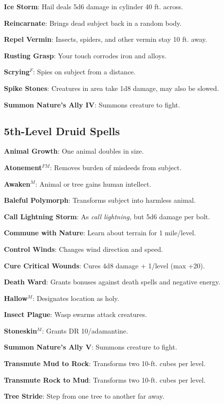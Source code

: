 \textbf{Ice Storm}: Hail deals 5d6 damage in cylinder 40 ft. across.

\textbf{Reincarnate}: Brings dead subject back in a random body.

\textbf{Repel Vermin}: Insects, spiders, and other vermin stay 10 ft. away.

\textbf{Rusting Grasp}: Your touch corrodes iron and alloys.

\textbf{Scrying}\(^{F}\): Spies on subject from a distance.

\textbf{Spike Stones}: Creatures in area take 1d8 damage, may also be slowed\textit{.}

\textbf{Summon Nature's Ally IV}: Summons creature to fight.

\subsection{5th-Level Druid Spells}


\textbf{Animal Growth}: One animal doubles in size.

\textbf{Atonement}\(^{FM}\): Removes burden of misdeeds from subject.

\textbf{Awaken}\(^{M}\): Animal or tree gains human intellect.

\textbf{Baleful Polymorph}: Transforms subject into harmless animal.

\textbf{Call Lightning Storm}: As \textit{call lightning, }but 5d6 damage per bolt.

\textbf{Commune with Nature}: Learn about terrain for 1 mile/level.

\textbf{Control Winds}: Changes wind direction and speed.

\textbf{Cure Critical Wounds}: Cures 4d8 damage + 1/level (max +20).

\textbf{Death Ward}: Grants bonuses against death spells and negative energy.

\textbf{Hallow}\(^{M}\): Designates location as holy.

\textbf{Insect Plague}: Wasp swarms attack creatures.

\textbf{Stoneskin}\(^{M}\): Grants DR 10/adamantine.

\textbf{Summon Nature's Ally V}: Summons creature to fight.

\textbf{Transmute Mud to Rock}: Transforms two 10-ft. cubes per level.

\textbf{Transmute Rock to Mud}: Transforms two 10-ft. cubes per level.

\textbf{Tree Stride}: Step from one tree to another far away.

